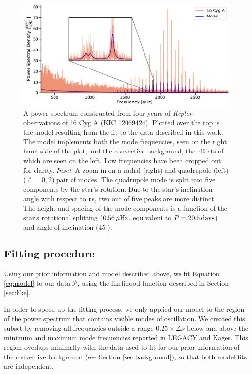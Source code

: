 \documentclass[12pt]{article}
\newcommand{\kepler}{\emph{Kepler}\xspace}
\begin{document}
 \begin{figure}
	\centering
	\includegraphics[width=.99\textwidth]{Images/modelfit.pdf}
	\caption{A power spectrum constructed from four years of \kepler observations of 16 Cyg A (KIC 12069424). Plotted over the top is the model resulting from the fit to the data described in this work. The model implements both the mode frequencies, seen on the right hand side of the plot, and the convective background, the effects of which are seen on the left. Low frequencies have been cropped out for clarity. \textit{Inset}: A zoom in on a radial (right) and quadrupole (left) ($\ell = 0, 2$) pair of modes. The quadrupole mode is split into five components by the star's rotation. Due to the star's inclination angle with respect to us, two out of five peaks are more distinct. The height and spacing of the mode components is a function of the star's rotational splitting ($0.56\, \mu\rm{Hz}$, equivalent to $P = 20.5\, \rm{days}$) and angle of inclination ($45^\circ$).}
	\label{fig:modelfit}
\end{figure}


\subsection{Fitting procedure}
Using our prior information and model described above, we fit Equation \ref{eq:model} to our data $\mathcal{P}$, using the likelihood function described in Section \ref{sec:like}.

In order to speed up the fitting process, we only applied our model to the region of the power spectrum that contains visible modes of oscillation. We created this subset by removing all frequencies outside a range $0.25 \times \Delta\nu$ below and above the minimum and maximum mode frequencies reported in LEGACY and Kages. This region overlaps minimally with the data used to fit for our prior information of the convective background (see Section \ref{sec:background}), so that both model fits are independent.
\end{document}
